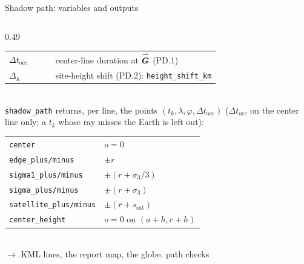 \begin{frame}{Shadow path: variables and outputs}
\begin{columns}[T]
\begin{column}{0.49\textwidth}
\begin{tabular}{@{}l >{\raggedright\arraybackslash}p{0.78\linewidth}@{}}
        $\Delta t_{\mathrm{occ}}$ & center-line duration at $\overset{\rightharpoonup}{\bm{G}}$ (PD.1) \\
        $\Delta_h$ & site-height shift (PD.2): \texttt{height\_shift\_km} \\
      \end{tabular}\\[0.6ex]
      \texttt{shadow\_path} returns, per line, the points $(t_k, \lambda, \varphi, \Delta t_{\mathrm{occ}})$
      ($\Delta t_{\mathrm{occ}}$ on the center line only; a $t_k$ whose ray misses the Earth is left out):\\[0.3ex]
      \begin{tabular}{@{}l l@{}}
        \texttt{center} & $o = 0$ \\
        \texttt{edge\_plus/minus} & $\pm r$ \\
        \texttt{sigma1\_plus/minus} & $\pm(r + \sigma_3/3)$ \\
        \texttt{sigma\_plus/minus} & $\pm(r + \sigma_3)$ \\
        \texttt{satellite\_plus/minus} & $\pm(r + s_{\mathrm{sat}})$ \\
        \texttt{center\_height} & $o = 0$ on $(a{+}h, c{+}h)$ \\
      \end{tabular}\\[0.4ex]
      $\to$ KML lines, the report map, the globe, path checks
    \end{column}
  \end{columns}
\end{frame}

